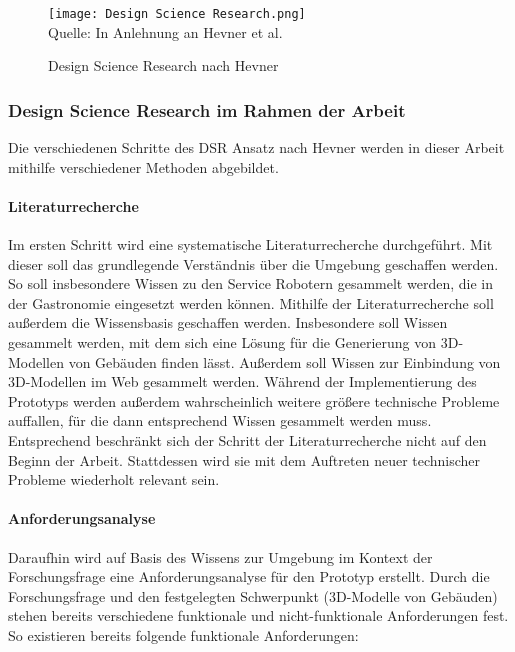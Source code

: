 \begin{figure}[H]
    \caption{Design Science Research nach Hevner}\label{fig:DesignScienceResearch}
    \texttt{[image: Design Science Research.png]}
    \\
    Quelle: In Anlehnung an Hevner et al. \cite[S.~80]{Hevner2004}
\end{figure}

\subsubsection{Design Science Research im Rahmen der Arbeit}

Die verschiedenen Schritte des \ac{DSR} Ansatz nach Hevner werden in dieser Arbeit mithilfe verschiedener Methoden abgebildet.

\paragraph{Literaturrecherche}
Im ersten Schritt wird eine systematische Literaturrecherche durchgeführt. Mit dieser soll das grundlegende Verständnis über die Umgebung geschaffen werden. So soll insbesondere Wissen zu den Service Robotern gesammelt werden, die in der Gastronomie eingesetzt werden können. Mithilfe der Literaturrecherche soll außerdem die Wissensbasis geschaffen werden. Insbesondere soll Wissen gesammelt werden, mit dem sich eine Lösung für die Generierung von 3D-Modellen von Gebäuden finden lässt. Außerdem soll Wissen zur Einbindung von 3D-Modellen im Web gesammelt werden. Während der Implementierung des Prototyps werden außerdem wahrscheinlich weitere größere technische Probleme auffallen, für die dann entsprechend Wissen gesammelt werden muss. Entsprechend beschränkt sich der Schritt der Literaturrecherche nicht auf den Beginn der Arbeit. Stattdessen wird sie mit dem Auftreten neuer technischer Probleme wiederholt relevant sein.

\paragraph{Anforderungsanalyse}
Daraufhin wird auf Basis des Wissens zur Umgebung im Kontext der Forschungsfrage eine Anforderungsanalyse für den Prototyp erstellt. Durch die Forschungsfrage und den festgelegten Schwerpunkt (3D-Modelle von Gebäuden) stehen bereits verschiedene funktionale und nicht-funktionale Anforderungen fest. So existieren bereits folgende funktionale Anforderungen:

